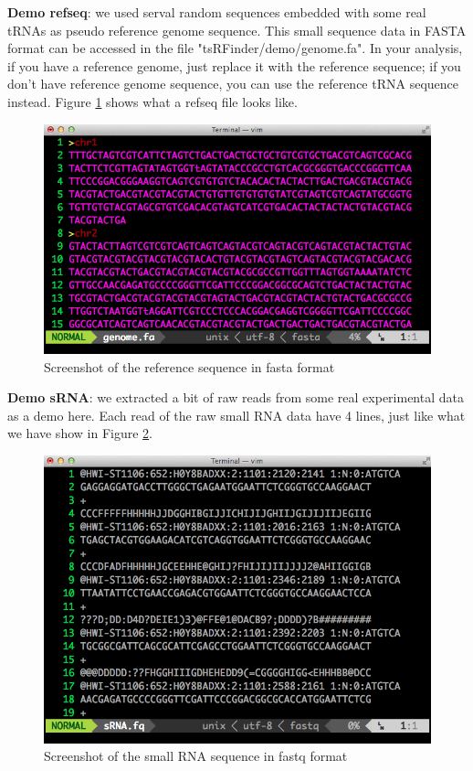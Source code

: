 \documentclass[11pt, a4paper]{article}
\begin{document}
\textbf{Demo refseq}: we used serval random sequences embedded with some real tRNAs as pseudo reference genome sequence. This small sequence data in FASTA format can be accessed in the file "tsRFinder/demo/genome.fa". In your analysis, if you have a reference genome, just replace it with the reference sequence; if you don't have reference genome sequence, you can use the reference tRNA sequence instead. Figure \ref{refseq} shows what a refseq file looks like.

\begin{figure}[htbp]
\begin{center}
\includegraphics[width=12cm]{refseq.png}
\caption{Screenshot of the reference sequence in fasta format} 
\label{refseq}
\end{center}
\end{figure}

\textbf{Demo sRNA}: we extracted a bit of raw reads from some real experimental data as a demo here. Each read of the raw small RNA data have 4 lines, just like what we have show in Figure \ref{fastq}.

\begin{figure}[htbp]
\begin{center}
\includegraphics[width=12cm]{fastq.png}
\caption{Screenshot of the small RNA sequence in fastq format} 
\label{fastq}
\end{center}
\end{figure}
\end{document}
